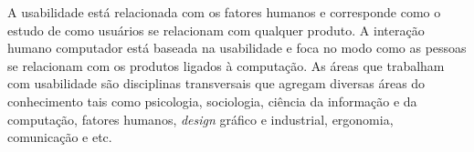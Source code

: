 A usabilidade está relacionada com os fatores humanos e corresponde como o estudo de como usuários se relacionam com qualquer produto. A interação humano computador está baseada na usabilidade e foca no modo como as pessoas se relacionam com os produtos ligados à computação.
%
As áreas que trabalham com usabilidade são disciplinas transversais que agregam diversas áreas do conhecimento tais como psicologia, sociologia, ciência da informação e da computação, fatores humanos, \emph{design} gráfico e industrial, ergonomia, comunicação e etc.
%

